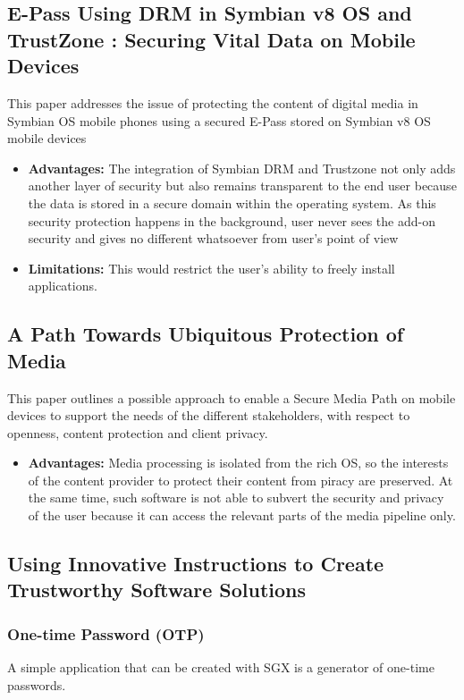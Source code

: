 \documentclass[conference]{IEEEtran}
\begin{document}
\subsection{E-Pass Using DRM in Symbian v8 OS and TrustZone : Securing Vital Data on Mobile Devices}
This paper addresses the issue of protecting the content of digital media in Symbian OS mobile phones using a secured E-Pass stored on Symbian v8 OS mobile devices
\begin{itemize}
    \item \textbf{Advantages:}  The integration of Symbian DRM and Trustzone not only adds another layer of security but also remains transparent to the end user because the data is stored in a secure domain within the operating system. As this security protection happens in the background, user never sees the add-on security and gives no different whatsoever from user’s point of view
    \item \textbf{Limitations:} This would restrict the user's ability to freely install applications.
\end{itemize}


\subsection{A Path Towards Ubiquitous Protection of Media}
This paper outlines a possible approach to enable a Secure Media Path on mobile devices to support the needs of the different stakeholders, with respect to openness, content protection and client privacy.
\begin{itemize}
    \item \textbf{Advantages:}  Media processing is isolated from the rich OS,  so the interests of the content provider to protect their content from piracy are preserved. At the same time, such software is not able to subvert the security and privacy of the user because it can access the relevant parts of the media pipeline only.
\end{itemize}

\subsection{Using Innovative Instructions to Create Trustworthy Software Solutions}
\subsubsection{One-time Password (OTP)}
A simple application that can be created with SGX is a generator of one-time passwords.
\end{document}
